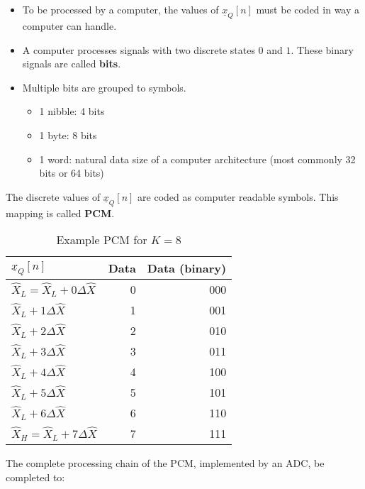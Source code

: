 \begin{refsection}
\begin{itemize}
	\item To be processed by a computer, the values of $\underline{x}_Q[n]$ must be coded in way a computer can handle.
	\item A computer processes signals with two discrete states $0$ and $1$. These binary signals are called  \textbf{bits}.
	\item Multiple bits are grouped to symbols.
	\begin{itemize}
		\item {} 1 nibble: 4 bits
		\item {} 1 byte: 8 bits
		\item {} 1 word: natural data size of a computer architecture (most commonly 32 bits or 64 bits)
	\end{itemize}
\end{itemize}

The discrete values of $\underline{x}_Q[n]$ are coded as computer readable symbols. This mapping is called  \textbf{\ac{PCM}}.

\begin{table}[H]
	\centering
	\caption[Example PCM for $K = 8$]{Example \ac{PCM} for $K = 8$}
	\begin{tabular}{|l|r|r|}
		\hline
		$\underline{x}_Q[n]$ & Data & Data (binary) \\
		\hline
		\hline
		$\hat{X}_L = \hat{X}_L + 0 \Delta \hat{X}$ & 0 & 000 \\
		\hline
		$\hat{X}_L + 1 \Delta \hat{X}$ & 1 & 001 \\
		\hline
		$\hat{X}_L + 2 \Delta \hat{X}$ & 2 & 010 \\
		\hline
		$\hat{X}_L + 3 \Delta \hat{X}$ & 3 & 011 \\
		\hline
		$\hat{X}_L + 4 \Delta \hat{X}$ & 4 & 100 \\
		\hline
		$\hat{X}_L + 5 \Delta \hat{X}$ & 5 & 101 \\
		\hline
		$\hat{X}_L + 6 \Delta \hat{X}$ & 6 & 110 \\
		\hline
		$\hat{X}_H = \hat{X}_L + 7 \Delta \hat{X}$ & 7 & 111 \\
		\hline
	\end{tabular}
\end{table}

The complete processing chain of the \ac{PCM}, implemented by an \ac{ADC}, be completed to:
\begin{figure}[H]
	\centering
	\begin{adjustbox}{scale=0.8}
\end{adjustbox}
\end{figure}
\end{refsection}
